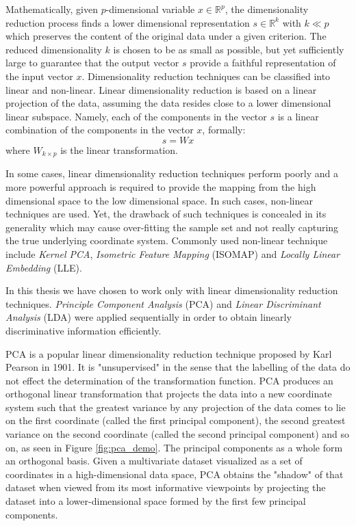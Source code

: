 \iftoggle{edit-mode}{\hspace{0pt}\marginpar{Mathematical Definition}}{}
Mathematically, given $p$-dimensional variable $x \in \mathds{R}^p$, the dimensionality reduction process finds a lower dimensional representation $s \in \mathds{R}^k$ with $k \ll p$ which preserves the content of the original data under a given criterion. 
The reduced dimensionality $k$ is chosen to be as small as possible, but yet sufficiently large to guarantee that the output vector $s$ provide a faithful representation of the input vector $x$. 
Dimensionality reduction techniques can be classified into linear and non-linear. 
Linear dimensionality reduction is based on a linear projection of the data, assuming the data resides close to a lower dimensional linear subspace. 
Namely, each of the components in the vector $s$ is a linear combination of the components in the vector $x$, formally:
\begin{equation}
s=Wx
\end{equation}
where $W_{k \times p}$ is the linear transformation.

\iftoggle{edit-mode}{\hspace{0pt}\marginpar{Non-Linear DR}}{}
In some cases, linear dimensionality reduction techniques perform poorly and a more powerful approach is required to provide the mapping from the high dimensional space to the low dimensional space. 
In such cases, non-linear techniques are used. 
Yet, the drawback of such techniques is concealed in its generality which may cause over-fitting the sample set and not really capturing the true underlying coordinate system. 
Commonly used non-linear technique include \emph{Kernel PCA}, \emph{Isometric Feature Mapping} (ISOMAP) and \emph{Locally Linear Embedding} (LLE).

\iftoggle{edit-mode}{\hspace{0pt}\marginpar{What DR we use?}}{}
In this thesis we have chosen to work only with linear dimensionality reduction techniques. 
\emph{Principle Component Analysis} (PCA) and \emph{Linear Discriminant Analysis} (LDA) were applied sequentially in order to obtain linearly discriminative information efficiently.

\iftoggle{edit-mode}{\hspace{0pt}\marginpar{PCA}}{}
PCA is a popular linear dimensionality reduction technique proposed by Karl Pearson \cite{pearson1901principal} in 1901. 
It is "unsupervised" in the sense that the labelling of the data do not effect the determination of the transformation function. 
PCA produces an orthogonal linear transformation that projects the data into a new coordinate system such that the greatest variance by any projection of the data comes to lie on the first coordinate (called the first principal component), the second greatest variance on the second coordinate (called the second principal component) and so on, as seen in Figure \ref{fig:pca_demo}. 
The principal components as a whole form an orthogonal basis. 
Given a multivariate dataset visualized as a set of coordinates in a high-dimensional data space, PCA obtains the "shadow" of that dataset when viewed from its most informative viewpoints by projecting the dataset into a lower-dimensional space formed by the first few principal components.

